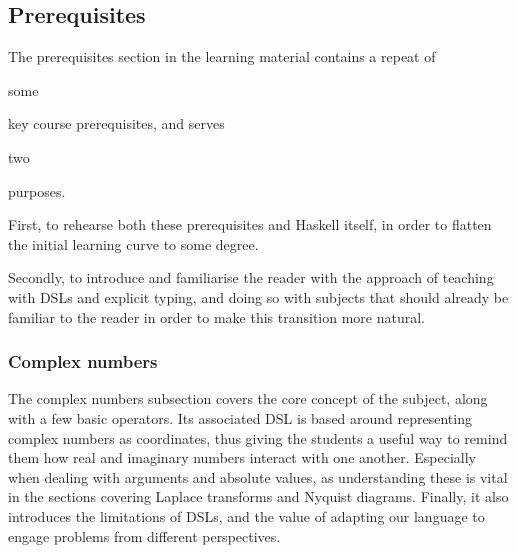 \subsection{Prerequisites}
The prerequisites section in the learning material contains a repeat of 
\begin{newtext}
some 
\end{newtext}
key course prerequisites, and serves \begin{modtext}two\end{modtext} purposes. 
\begin{modtext}
First, to rehearse both these prerequisites and Haskell itself, in order to flatten the initial learning curve to some degree. %

Secondly, to introduce and familiarise the reader with the approach of teaching with \gls{DSL}s and explicit typing, and doing so with subjects that should already be familiar to the reader in order to make this transition more natural. %
\end{modtext}

\subsubsection{Complex numbers} 
The complex numbers subsection covers the core concept of the subject, along with a few basic operators. Its associated \gls{DSL} is based around representing complex numbers as coordinates, thus giving the students a useful way to remind them how real and imaginary numbers interact with one another. Especially when dealing with arguments and absolute values, as understanding these is vital in the sections covering Laplace transforms and Nyquist diagrams. Finally, it also introduces the limitations of \gls{DSL}s, and the value of adapting our language to engage problems from different perspectives.


